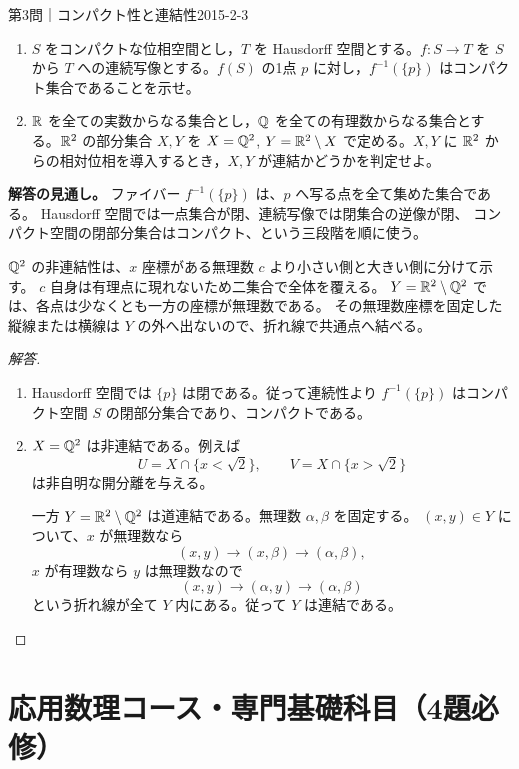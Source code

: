 \begin{problem}{第3問｜コンパクト性と連結性}{2015-2-3}
\begin{enumerate}
  \item[(1)] $S$ をコンパクトな位相空間とし，$T$ を Hausdorff 空間とする。$f:S\to T$ を $S$ から $T$ への連続写像とする。$f(S)$ の1点 $p$ に対し，$f^{-1}(\{p\})$ はコンパクト集合であることを示せ。
  \item[(2)] $\mathbb{R}$ を全ての実数からなる集合とし，$\mathbb{Q}$ を全ての有理数からなる集合とする。$\mathbb{R}^2$ の部分集合 $X,Y$ を $X=\mathbb{Q}^2$, $Y=\mathbb{R}^2\setminus X$ で定める。$X,Y$ に $\mathbb{R}^2$ からの相対位相を導入するとき，$X,Y$ が連結かどうかを判定せよ。
\end{enumerate}
\end{problem}
\begin{memo*}
\textbf{解答の見通し。}
ファイバー $f^{-1}(\{p\})$ は、$p$ へ写る点を全て集めた集合である。
Hausdorff 空間では一点集合が閉、連続写像では閉集合の逆像が閉、
コンパクト空間の閉部分集合はコンパクト、という三段階を順に使う。

$\mathbb{Q}^2$ の非連結性は、$x$ 座標がある無理数 $c$ より小さい側と大きい側に分けて示す。
$c$ 自身は有理点に現れないため二集合で全体を覆える。
$Y=\mathbb{R}^2\setminus\mathbb{Q}^2$ では、各点は少なくとも一方の座標が無理数である。
その無理数座標を固定した縦線または横線は $Y$ の外へ出ないので、折れ線で共通点へ結べる。
\end{memo*}
\begin{proof}[解答]
\begin{enumerate}
  \item[(1)] Hausdorff 空間では $\{p\}$ は閉である。従って連続性より
  $f^{-1}(\{p\})$ はコンパクト空間 $S$ の閉部分集合であり、コンパクトである。

  \item[(2)] $X=\mathbb{Q}^2$ は非連結である。例えば
  \[
  U=X\cap\{x<\sqrt2\},\qquad V=X\cap\{x>\sqrt2\}
  \]
  は非自明な開分離を与える。

  一方 $Y=\mathbb{R}^2\setminus\mathbb{Q}^2$ は道連結である。無理数 $\alpha,\beta$ を固定する。
  $(x,y)\in Y$ について、$x$ が無理数なら
  \[
  (x,y)\longrightarrow(x,\beta)\longrightarrow(\alpha,\beta),
  \]
  $x$ が有理数なら $y$ は無理数なので
  \[
  (x,y)\longrightarrow(\alpha,y)\longrightarrow(\alpha,\beta)
  \]
  という折れ線が全て $Y$ 内にある。従って $Y$ は連結である。
\end{enumerate}
\end{proof}

\section{応用数理コース・専門基礎科目（4題必修）}

